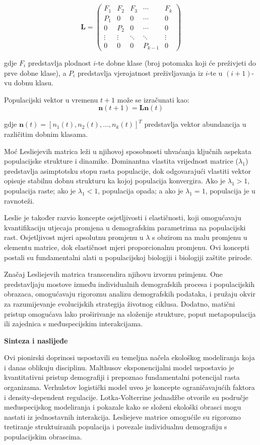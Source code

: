 \documentclass[11pt,oneside]{book}
\begin{document}
$$\mathbf{L} = \begin{pmatrix}
	F_1 & F_2 & F_3 & \cdots & F_k \\
	P_1 & 0 & 0 & \cdots & 0 \\
	0 & P_2 & 0 & \cdots & 0 \\
	\vdots & \vdots & \ddots & \ddots & \vdots \\
	0 & 0 & 0 & P_{k-1} & 0
\end{pmatrix}$$

gdje $F_i$ predstavlja plodnost $i$-te dobne klase (broj potomaka koji će preživjeti do prve dobne klase), a $P_i$ predstavlja vjerojatnost preživljavanja iz $i$-te u $(i+1)$-vu dobnu klasu.

Populacijski vektor u vremenu $t+1$ može se izračunati kao:
$$\mathbf{n}(t+1) = \mathbf{L} \mathbf{n}(t)$$

gdje $\mathbf{n}(t) = [n_1(t), n_2(t), \ldots, n_k(t)]^T$ predstavlja vektor abundancija u različitim dobnim klasama.

Moć Lesliejevih matrica leži u njihovoj sposobnosti uhvaćanja ključnih aspekata populacijske strukture i dinamike. Dominantna vlastita vrijednost matrice ($\lambda_1$) predstavlja asimptotsku stopu rasta populacije, dok odgovarajući vlastiti vektor opisuje stabilnu dobnu strukturu ka kojoj populacija konvergira. Ako je $\lambda_1 > 1$, populacija raste; ako je $\lambda_1 < 1$, populacija opada; a ako je $\lambda_1 = 1$, populacija je u ravnoteži.

Leslie je također razvio koncepte osjetljivosti i elastičnosti, koji omogućavaju kvantifikaciju utjecaja promjena u demografskim parametrima na populacijski rast. Osjetljivost mjeri apsolutnu promjenu u $\lambda$ s obzirom na malu promjenu u elementu matrice, dok elastičnost mjeri proporcionalnu promjenu. Ovi koncepti postali su fundamentalni alati u populacijskoj biologiji i biologiji zaštite prirode.

Značaj Lesliejevih matrica transcendira njihovu izvornu primjenu. One predstavljaju mostove između individualnih demografskih procesa i populacijskih obrazaca, omogućavaju rigoroznu analizu demografskih podataka, i pružaju okvir za razumijevanje evolucijskih strategija životnog ciklusa. Dodatno, matični pristup omogućava lako proširivanje na složenije strukture, poput metapopulacija ili zajednica s međuspecijskim interakcijama.

\textbf{Sinteza i naslijeđe}

Ovi pionirski doprinosi uspostavili su temeljna načela ekološkog modeliranja koja i danas oblikuju disciplinu. Malthusov eksponencijalni model uspostavio je kvantitativni pristup demografiji i prepoznao fundamentalni potencijal rasta organizama. Verhulstov logistički model uveo je koncepte ograničavajućih faktora i density-dependent regulacije. Lotka-Volterrine jednadžbe otvorile su područje međuspecijskog modeliranja i pokazale kako se složeni ekološki obrasci mogu nastati iz jednostavnih interakcija. Lesliejeve matrice omogućile su rigorozno tretiranje struktuiranih populacija i povezale individualnu demografiju s populacijskim obrascima.
\end{document}
